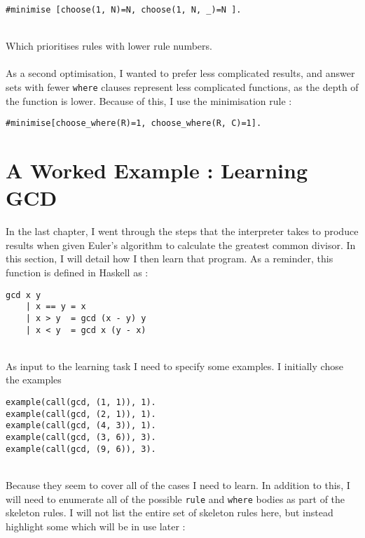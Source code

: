 \begin{lstlisting}
#minimise [choose(1, N)=N, choose(1, N, _)=N ].
\end{lstlisting}
\mbox{}\\
Which prioritises rules with lower rule numbers.\\ \\
As a second optimisation, I wanted to prefer less complicated results, and answer sets with fewer \lstinline{where} clauses represent less complicated functions, as the depth of the function is lower. Because of this, I use the minimisation rule : \\ %

\begin{lstlisting}
#minimise[choose_where(R)=1, choose_where(R, C)=1].
\end{lstlisting}

\section{A Worked Example : Learning GCD}
In the last chapter, I went through the steps that the interpreter takes to produce results when given Euler's algorithm to calculate the greatest common divisor. In this section, I will detail how I then learn that program. As a reminder, this function is defined in Haskell as :

\begin{lstlisting}
gcd x y
	| x == y = x
	| x > y	 = gcd (x - y) y
	| x < y	 = gcd x (y - x)
\end{lstlisting}
\mbox{}\\
As input to the learning task I need to specify some examples. I initially chose the examples \\


\begin{lstlisting}
example(call(gcd, (1, 1)), 1).
example(call(gcd, (2, 1)), 1).
example(call(gcd, (4, 3)), 1).
example(call(gcd, (3, 6)), 3).
example(call(gcd, (9, 6)), 3).
\end{lstlisting}
\mbox{}\\
Because they seem to cover all of the cases I need to learn. In addition to this, I will need to enumerate all of the possible \lstinline{rule} and \lstinline{where} bodies as part of the skeleton rules. I will not list the entire set of skeleton rules here, but instead highlight some which will be in use later : \\

